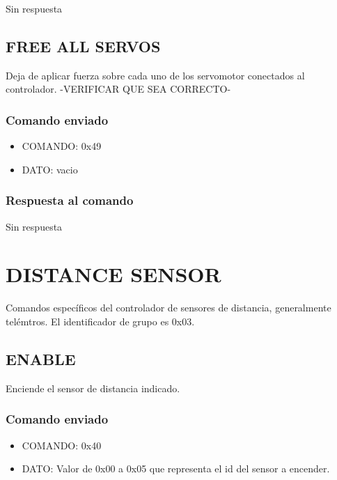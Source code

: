 \documentclass[a4paper,11pt]{article}
\begin{document}
Sin respuesta

\subsection{FREE ALL SERVOS}
\label{free_all_servos}

Deja de aplicar fuerza sobre cada uno de los servomotor conectados al controlador. -VERIFICAR QUE SEA CORRECTO-

\subsubsection*{Comando enviado}
\label{free_all_servos_comando_enviado}

\begin{itemize}
	\item{COMANDO:} 0x49
	\item{DATO:} vacio
\end{itemize}

\subsubsection*{Respuesta al comando}
\label{free_all_servos_respuesta}

Sin respuesta

\section{DISTANCE SENSOR} 
\label{grupo_distance_sensor}

Comandos espec\'ificos del controlador de sensores de distancia, generalmente tel\'emtros.
El identificador de grupo es 0x03.

\subsection{ENABLE}
\label{enable}

Enciende el sensor de distancia indicado.

\subsubsection*{Comando enviado}
\label{enable_d_comando_enviado}

\begin{itemize}
	\item{COMANDO:} 0x40
	\item{DATO:} Valor de 0x00 a 0x05 que representa el id del sensor a encender.
\end{itemize}
\end{document}
